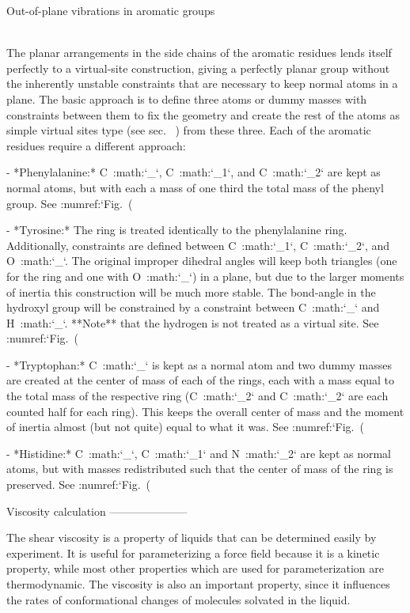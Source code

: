 Out-of-plane vibrations in aromatic groups
~~~~~~~~~~~~~~~~~~~~~~~~~~~~~~~~~~~~~~~~~~

The planar arrangements in the side chains of the aromatic residues
lends itself perfectly to a virtual-site construction, giving a
perfectly planar group without the inherently unstable constraints that
are necessary to keep normal atoms in a plane. The basic approach is to
define three atoms or dummy masses with constraints between them to fix
the geometry and create the rest of the atoms as simple virtual sites
type (see sec. 
) from these three.
Each of the aromatic residues require a different approach:

-  *Phenylalanine:* C\ :math:`_\gamma`,
   C\ :math:`_{{\epsilon}1}`, and
   C\ :math:`_{{\epsilon}2}` are kept as normal atoms,
   but with each a mass of one third the total mass of the phenyl group.
   See :numref:`Fig. (%

-  *Tyrosine:* The ring is treated identically to the phenylalanine
   ring. Additionally, constraints are defined between
   C\ :math:`_{{\epsilon}1}`,
   C\ :math:`_{{\epsilon}2}`, and
   O\ :math:`_{\eta}`. The original improper dihedral
   angles will keep both triangles (one for the ring and one with
   O\ :math:`_{\eta}`) in a plane, but due to the larger
   moments of inertia this construction will be much more stable. The
   bond-angle in the hydroxyl group will be constrained by a constraint
   between C\ :math:`_\gamma` and
   H\ :math:`_{\eta}`. **Note** that the hydrogen is not
   treated as a virtual site. See
   :numref:`Fig. (%

-  *Tryptophan:* C\ :math:`_\beta` is kept as a normal
   atom and two dummy masses are created at the center of mass of each
   of the rings, each with a mass equal to the total mass of the
   respective ring (C\ :math:`_{{\delta}2}` and
   C\ :math:`_{{\epsilon}2}` are each counted half for
   each ring). This keeps the overall center of mass and the moment of
   inertia almost (but not quite) equal to what it was. See
   :numref:`Fig. (%

-  *Histidine:* C\ :math:`_\gamma`,
   C\ :math:`_{{\epsilon}1}` and
   N\ :math:`_{{\epsilon}2}` are kept as normal atoms,
   but with masses redistributed such that the center of mass of the
   ring is preserved. See :numref:`Fig. (%

Viscosity calculation
---------------------

The shear viscosity is a property of liquids that can be determined
easily by experiment. It is useful for parameterizing a force field
because it is a kinetic property, while most other properties which are
used for parameterization are thermodynamic. The viscosity is also an
important property, since it influences the rates of conformational
changes of molecules solvated in the liquid.

